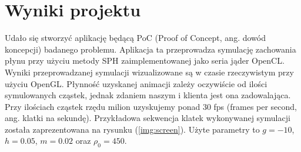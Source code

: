 \documentclass[polish, 12pt]{aghthesis}
\begin{document}
\section{Wyniki projektu}

Udało się stworzyć aplikację będącą PoC (Proof of Concept, ang. dowód koncepcji) badanego problemu. Aplikacja ta przeprowadza symulację zachowania płynu przy użyciu metody SPH zaimplementowanej jako seria jąder OpenCL. Wyniki przeprowadzanej symulacji wizualizowane są w czasie rzeczywistym przy użyciu OpenGL. Płynność uzyskanej animacji zależy oczywiście od ilości symulowanych cząstek, jednak zdaniem naszym i klienta jest ona zadowalająca. Przy ilościach cząstek rzędu milion uzyskujemy ponad 30 fps (frames per second, ang. klatki na sekundę). Przykładowa sekwencja klatek wykonywanej symulacji została zaprezentowana na rysunku (\ref{img:screen}). Użyte parametry to $g=-10$, $h=0.05$, $m=0.02$ oraz $\rho_0=450$.
\end{document}
